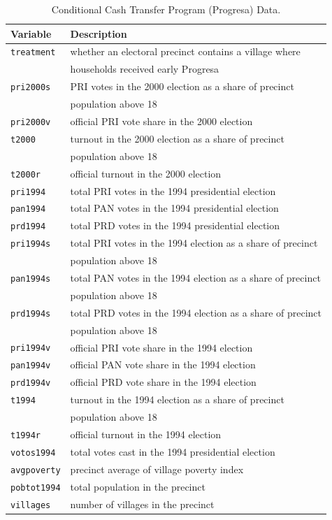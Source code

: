 \documentclass[12pt]{article}
\begin{document}
\begin{table}[!ht]
\centering
\caption{Conditional Cash Transfer Program (Progresa) Data.}
\label{table:cash_transfer}
\begin{tabular}{ll}
\hline
\textbf{Variable} & \textbf{Description} \\ \hline
\texttt{treatment} & whether an electoral precinct contains a village where \\
                   & households received early Progresa \\ 
\texttt{pri2000s} & PRI votes in the 2000 election as a share of precinct \\
                  & population above 18 \\ 
\texttt{pri2000v} & official PRI vote share in the 2000 election \\ 
\texttt{t2000} & turnout in the 2000 election as a share of precinct \\
               & population above 18 \\ 
\texttt{t2000r} & official turnout in the 2000 election \\ 
\texttt{pri1994} & total PRI votes in the 1994 presidential election \\ 
\texttt{pan1994} & total PAN votes in the 1994 presidential election \\ 
\texttt{prd1994} & total PRD votes in the 1994 presidential election \\ 
\texttt{pri1994s} & total PRI votes in the 1994 election as a share of precinct \\
                  & population above 18 \\ 
\texttt{pan1994s} & total PAN votes in the 1994 election as a share of precinct \\
                  & population above 18 \\ 
\texttt{prd1994s} & total PRD votes in the 1994 election as a share of precinct \\
                  & population above 18 \\ 
\texttt{pri1994v} & official PRI vote share in the 1994 election \\ 
\texttt{pan1994v} & official PAN vote share in the 1994 election \\ 
\texttt{prd1994v} & official PRD vote share in the 1994 election \\ 
\texttt{t1994} & turnout in the 1994 election as a share of precinct \\
               & population above 18 \\ 
\texttt{t1994r} & official turnout in the 1994 election \\ 
\texttt{votos1994} & total votes cast in the 1994 presidential election \\ 
\texttt{avgpoverty} & precinct average of village poverty index \\ 
\texttt{pobtot1994} & total population in the precinct \\ 
\texttt{villages} & number of villages in the precinct \\ \hline
\end{tabular}
\end{table}
\end{document}
